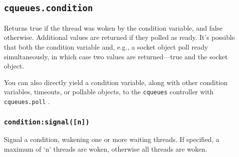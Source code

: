 \documentclass[11pt, oneside]{memoir}
\newcommand{\cqueues}[0]{\texttt{cqueues} }
\newcommand{\fn}[1]{\texttt{#1} }
\newcounter{toccols}
\newenvironment{Module}[1]{
	\subsection{\texttt{#1}}
	\addtocontents{toc}{
		\protect\begin{multicols}{\value{toccols}}
	}
}{
	\addtocontents{toc}{\protect\end{multicols}}
}
\begin{document}
\begin{Module}{cqueues.condition}
Returns true if the thread was woken by the condition variable, and false otherwise. Additional values are returned if they polled as ready. It's possible that both the condition variable and, e.g., a socket object poll ready simultaneously, in which case two values are returned---true and the socket object.

You can also directly yield a condition variable, along with other condition variables, timeouts, or pollable objects, to the \cqueues controller with \fn{cqueues.poll}.

\subsubsection[\fn{condition:signal}]{\fn{condition:signal([n])}}

Signal a condition, wakening one or more waiting threads. If specified, a maximum of `n' threads are woken, otherwise all threads are woken.

\end{Module}
\end{document}
